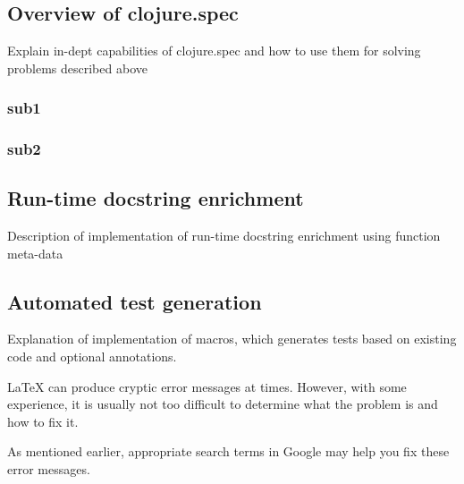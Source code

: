 \chapter{}
\label{chap:implementation}

\section{Overview of clojure.spec}
Explain in-dept capabilities of clojure.spec and how to use them for solving
problems described above
\subsection{sub1}
\subsection{sub2}

\section{Run-time docstring enrichment}
Description of implementation of run-time docstring enrichment using function
meta-data

\section{Automated test generation}
Explanation of implementation of macros, which generates tests based on existing
code and optional annotations.

\LaTeX{} can produce cryptic error messages at times.
However, with some experience, it is usually not too
difficult to determine what the problem is and how to fix it.

As mentioned earlier, appropriate search terms in Google
may help you fix these error messages.
